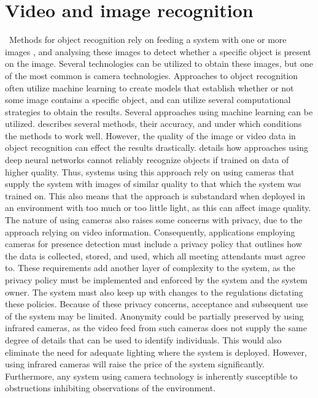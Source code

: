 \section{Video and image recognition} \label{sec:video-based-detection}\
Methods for object recognition rely on feeding a system with one or more images \cite{huttenlocher1987object, computational_strategies_for_object_recog}, and analysing these images to detect whether a specific object is present on the image.
Several technologies can be utilized to obtain these images, but one of the most common is camera technologies\cite{FUERTES2022103473}. 
Approaches to object recognition often utilize machine learning to create models that establish whether or not some image contains a specific object\cite{huttenlocher1987object}, and can utilize several computational strategies to obtain the results\cite{computational_strategies_for_object_recog}. 
Several approaches using machine learning can be utilized. 
\citeauthor{object_recognision_survey} \cite{object_recognision_survey} describes several methods, their accuracy, and under which conditions the methods to work well. 
However, the quality of the image or video data in object recognition can effect the results drastically.
\citeauthor{vid_qual_affects} \cite{vid_qual_affects} details how approaches using deep neural networks cannot reliably recognize objects if trained on data of higher quality. 
Thus, systems using this approach rely on using cameras that supply the system with images of similar quality to that which the system was trained on.
This also means that the approach is substandard when deployed in an environment with too much or too little light, as this can affect image quality.  
The nature of using cameras also raises some concerns with privacy, due to the approach relying on video information. 
Consequently, applications employing cameras for presence detection must include a privacy policy that outlines how the data is collected, stored, and used, which all meeting attendants must agree to.
These requirements add another layer of complexity to the system, as the privacy policy must be implemented and enforced by the system and the system owner.
The system must also keep up with changes to the regulations dictating these policies.
Because of these privacy concerns, acceptance and subsequent use of the system may be limited\cite{granath_detecting_nodate, tang_occupancy_2020, privacyPreservingSensor}.
Anonymity could be partially preserved by using infrared cameras, as the video feed from such cameras does not supply the same degree of details that can be used to identify individuals. 
This would also eliminate the need for adequate lighting where the system is deployed.  
However, using infrared cameras will raise the price of the system significantly. 
Furthermore, any system using camera technology is inherently susceptible to obstructions inhibiting observations of the environment.

